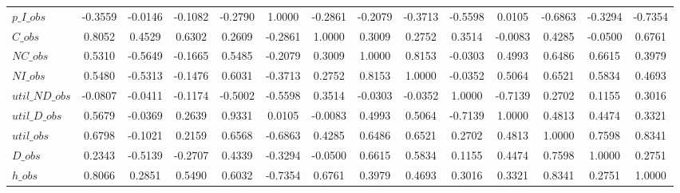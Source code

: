 \begin{center}
\begin{longtable}{lccccccccccccc}
$p\_I\_obs      $	 & 	          -0.3559	 & 	          -0.0146	 & 	          -0.1082	 & 	          -0.2790	 & 	           1.0000	 & 	          -0.2861	 & 	          -0.2079	 & 	          -0.3713	 & 	          -0.5598	 & 	           0.0105	 & 	          -0.6863	 & 	          -0.3294	 & 	          -0.7354 \\ 
$C\_obs         $	 & 	           0.8052	 & 	           0.4529	 & 	           0.6302	 & 	           0.2609	 & 	          -0.2861	 & 	           1.0000	 & 	           0.3009	 & 	           0.2752	 & 	           0.3514	 & 	          -0.0083	 & 	           0.4285	 & 	          -0.0500	 & 	           0.6761 \\ 
$NC\_obs        $	 & 	           0.5310	 & 	          -0.5649	 & 	          -0.1665	 & 	           0.5485	 & 	          -0.2079	 & 	           0.3009	 & 	           1.0000	 & 	           0.8153	 & 	          -0.0303	 & 	           0.4993	 & 	           0.6486	 & 	           0.6615	 & 	           0.3979 \\ 
$NI\_obs        $	 & 	           0.5480	 & 	          -0.5313	 & 	          -0.1476	 & 	           0.6031	 & 	          -0.3713	 & 	           0.2752	 & 	           0.8153	 & 	           1.0000	 & 	          -0.0352	 & 	           0.5064	 & 	           0.6521	 & 	           0.5834	 & 	           0.4693 \\ 
$util\_ND\_obs  $	 & 	          -0.0807	 & 	          -0.0411	 & 	          -0.1174	 & 	          -0.5002	 & 	          -0.5598	 & 	           0.3514	 & 	          -0.0303	 & 	          -0.0352	 & 	           1.0000	 & 	          -0.7139	 & 	           0.2702	 & 	           0.1155	 & 	           0.3016 \\ 
$util\_D\_obs   $	 & 	           0.5679	 & 	          -0.0369	 & 	           0.2639	 & 	           0.9331	 & 	           0.0105	 & 	          -0.0083	 & 	           0.4993	 & 	           0.5064	 & 	          -0.7139	 & 	           1.0000	 & 	           0.4813	 & 	           0.4474	 & 	           0.3321 \\ 
$util\_obs      $	 & 	           0.6798	 & 	          -0.1021	 & 	           0.2159	 & 	           0.6568	 & 	          -0.6863	 & 	           0.4285	 & 	           0.6486	 & 	           0.6521	 & 	           0.2702	 & 	           0.4813	 & 	           1.0000	 & 	           0.7598	 & 	           0.8341 \\ 
$D\_obs         $	 & 	           0.2343	 & 	          -0.5139	 & 	          -0.2707	 & 	           0.4339	 & 	          -0.3294	 & 	          -0.0500	 & 	           0.6615	 & 	           0.5834	 & 	           0.1155	 & 	           0.4474	 & 	           0.7598	 & 	           1.0000	 & 	           0.2751 \\ 
$h\_obs         $	 & 	           0.8066	 & 	           0.2851	 & 	           0.5490	 & 	           0.6032	 & 	          -0.7354	 & 	           0.6761	 & 	           0.3979	 & 	           0.4693	 & 	           0.3016	 & 	           0.3321	 & 	           0.8341	 & 	           0.2751	 & 	           1.0000 \\ 
\end{longtable}
 \end{center}
